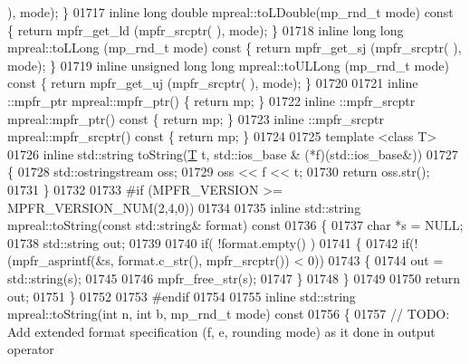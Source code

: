 \begin{DoxyCode}
      ), mode);    \}
01717 \textcolor{keyword}{inline} \textcolor{keywordtype}{long} \textcolor{keywordtype}{double}        mpreal::toLDouble(mp\_rnd\_t mode)\textcolor{keyword}{  const    }\{    \textcolor{keywordflow}{return}  mpfr\_get\_ld (mpfr\_srcptr(
      ), mode);    \}
01718 \textcolor{keyword}{inline} \textcolor{keywordtype}{long} \textcolor{keywordtype}{long}          mpreal::toLLong  (mp\_rnd\_t mode)\textcolor{keyword}{  const    }\{    \textcolor{keywordflow}{return}  mpfr\_get\_sj (mpfr\_srcptr(
      ), mode);    \}
01719 \textcolor{keyword}{inline} \textcolor{keywordtype}{unsigned} \textcolor{keywordtype}{long} \textcolor{keywordtype}{long} mpreal::toULLong (mp\_rnd\_t mode)\textcolor{keyword}{  const    }\{    \textcolor{keywordflow}{return}  mpfr\_get\_uj (mpfr\_srcptr(
      ), mode);    \}
01720 
01721 inline ::mpfr\_ptr     mpreal::mpfr\_ptr()             \{ \textcolor{keywordflow}{return} mp; \}
01722 inline ::mpfr\_srcptr  mpreal::mpfr\_ptr()\textcolor{keyword}{    const    }\{ \textcolor{keywordflow}{return} mp; \}
01723 inline ::mpfr\_srcptr  mpreal::mpfr\_srcptr()\textcolor{keyword}{ const    }\{ \textcolor{keywordflow}{return} mp; \}
01724 
01725 \textcolor{keyword}{template} <\textcolor{keyword}{class} T>
01726 \textcolor{keyword}{inline} std::string toString(\hyperlink{group___sparse_core___module_class_eigen_1_1_triplet}{T} t, std::ios\_base & (*f)(std::ios\_base&))
01727 \{
01728     std::ostringstream oss;
01729     oss << f << t;
01730     \textcolor{keywordflow}{return} oss.str();
01731 \}
01732 
01733 \textcolor{preprocessor}{#if (MPFR\_VERSION >= MPFR\_VERSION\_NUM(2,4,0))}
01734 
01735 \textcolor{keyword}{inline} std::string mpreal::toString(\textcolor{keyword}{const} std::string& format)\textcolor{keyword}{ const}
01736 \textcolor{keyword}{}\{
01737     \textcolor{keywordtype}{char} *s = NULL;
01738     std::string out;
01739 
01740     \textcolor{keywordflow}{if}( !format.empty() )
01741     \{
01742         \textcolor{keywordflow}{if}(!(mpfr\_asprintf(&s, format.c\_str(), mpfr\_srcptr()) < 0))
01743         \{
01744             out = std::string(s);
01745 
01746             mpfr\_free\_str(s);
01747         \}
01748     \}
01749 
01750     \textcolor{keywordflow}{return} out;
01751 \}
01752 
01753 \textcolor{preprocessor}{#endif}
01754 
01755 \textcolor{keyword}{inline} std::string mpreal::toString(\textcolor{keywordtype}{int} n, \textcolor{keywordtype}{int} b, mp\_rnd\_t mode)\textcolor{keyword}{ const}
01756 \textcolor{keyword}{}\{
01757     \textcolor{comment}{// TODO: Add extended format specification (f, e, rounding mode) as it done in output operator}

\end{DoxyCode}
